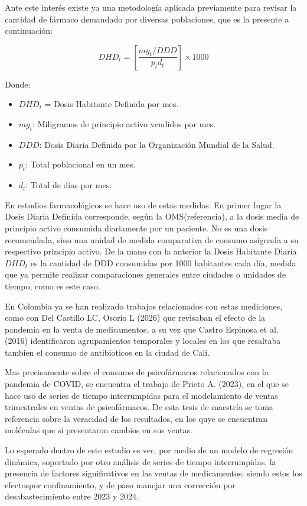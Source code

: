 \documentclass[10pt,twoside,xcolor=table,x11anmes]{IEEEtran}
\begin{document}
Ante este interés existe ya una metodología aplicada previamente para revisar la cantidad de fármaco demandado por diversas poblaciones, que es la presente a continuación:

\begin{equation}
    DHD_t = \left[ \frac{mg_t / DDD}{p_t d_t} \right] \times 1000
\end{equation}

Donde:

\begin{itemize}
    \item $DHD_t$ = Dosis Habitante Definida por mes.
    \item $mg_t$: Miligramos de principio activo vendidos por mes.
    \item $DDD$: Dosis Diaria Definida por la Organización Mundial de la Salud.
    \item $p_t$: Total poblacional en un mes.
    \item $d_t$: Total de días por mes.
\end{itemize}

En estudios farmacológicos se hace uso de estas medidas. En primer lugar la Dosis Diaria Definida corresponde, según la OMS(referencia), a la dosis media de principio activo consumida diariamente por un paciente. No es una dosis recomendada, sino una unidad de medida comparativa de consumo asignada a su respectivo principio activo. De la mano con la anterior la Dosis Habitante Diaria $DHD_t$ es la cantidad de DDD consumidas por 1000 habitantes cada día, medida que ya permite realizar comparaciones generales entre ciudades o unidades de tiempo, como es este caso.

En Colombia ya se han realizado trabajos relacionados con estas mediciones, como con Del Castillo LC, Osorio L (2026) que revisaban el efecto de la pandemia en la venta de medicamentos, a su vez que Castro Espinosa et al. (2016) identificaron agrupamientos temporales y locales en los que resaltaba tambien el consumo de antibioticos en la ciudad de Cali.

Mas precisamente sobre el consumo de psicofármacos relacionados con la pandemia de COVID, se encuentra el trabajo de Prieto A. (2023), en el que se hace uso de series de tiempo interrumpidas para el modelamiento de ventas trimestrales en ventas de psicofármacos. De esta tesis de maestría se toma referencia sobre la veracidad de los resultados, en los quye se encuentran moléculas que si presentaron cambios en sus ventas.

Lo esperado dentro de este estudio es ver, por medio de un modelo de regresión dinámica, soportado por otro análisis de series de tiempo interrumpidas, la presencia de factores significativos en las ventas de medicamentos; siendo estos los efectospor confinamiento, y de paso manejar una corrección por desabastecimiento entre 2023 y 2024.
\end{document}
